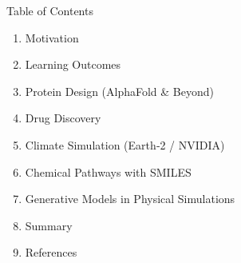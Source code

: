 \begin{frame}[allowframebreaks]{Table of Contents}
\begin{enumerate}
    \item Motivation
    \item Learning Outcomes
    \item Protein Design (AlphaFold \& Beyond)
    \item Drug Discovery
    \item Climate Simulation (Earth‑2 / NVIDIA)
    \item Chemical Pathways with SMILES
    \item Generative Models in Physical Simulations
    \item Summary
    \item References
\end{enumerate}
\end{frame}